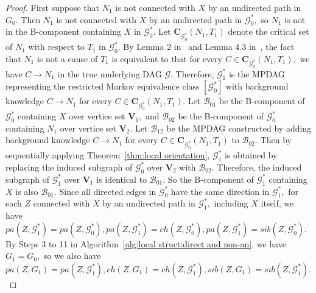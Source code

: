 \documentclass{article}
\begin{document}
\begin{proof}
First suppose that $N_1$ is not connected with $X$ by an undirected path in $G_0.$ Then $N_1$ is not connected with $X$ by an undirected path in $\mathcal{G}^*_0,$ so $N_1$ is not in the B-component containing $X$ in $\mathcal{G}^*_0.$ Let $\mathbf{C}_{\mathcal{G}^*_0}(N_1,T_1)$ denote the critical set of $N_1$ with respect to $T_1$ in $\mathcal{G}^*_0.$ By Lemma 2 in~\citet{fang2020ida} and Lemma 4.3 in~\citet{zuo2022counterfactual}, the fact that $N_1$ is not a cause of $T_1$ is equivalent to that for every $C\in \mathbf{C}_{\mathcal{G}^*_0}(N_1,T_1),$ we have $C\to N_1$ in the true underlying DAG $\mathcal{G}.$ Therefore, $\mathcal{G}^*_1$ is the MPDAG representing the restricted Markov equivalence class $[\mathcal{G}^*_0]$ with background knowledge $C\to N_1$ for every $C\in \mathbf{C}_{\mathcal{G}^*_0}(N_1,T_1).$ Let $\mathcal{B}_{01}$ be the B-component of $\mathcal{G}^*_0$ containing $X$ over vertice set $\mathbf{V}_1,$ and $\mathcal{B}_{02}$ be the B-component of $\mathcal{G}^*_0$ containing $N_1$ over vertice set $\mathbf{V}_2.$ Let $\mathcal{B}_{12}$ be the MPDAG constructed by adding background knowledge $C\to N_1$ for every $C\in \mathbf{C}_{\mathcal{G}^*_0}(N_1,T_1)$ to $\mathcal{B}_{02}.$ Then by sequentially applying Theorem~\ref{thm:local orientation}, $\mathcal{G}^*_1$ is obtained by replacing the induced subgraph of $\mathcal{G}^*_0$ over $\mathbf{V}_2$ with $\mathcal{B}_{02}.$ Therefore, the induced subgraph of $\mathcal{G}^*_1$ over $\mathbf{V}_1$ is identical to $\mathcal{B}_{01}.$ So the B-component of $\mathcal{G}^*_1$ containing $X$ is also $\mathcal{B}_{01}.$ Since all directed edges in $\mathcal{G}^*_0$ have the same direction in $\mathcal{G}^*_1,$ for each $Z$ connected with $X$ by an undirected path in $\mathcal{G}^*_1,$ including $X$ itself, we have $pa(Z,\mathcal{G}^*_1)=pa(Z,\mathcal{G}^*_0), pa(Z,\mathcal{G}^*_1)=ch(Z,\mathcal{G}^*_0), pa(Z,\mathcal{G}^*_1)=sib(Z,\mathcal{G}^*_0).$ By Steps 3 to 11 in Algorithm~\ref{alg:local struct:direct and non-an}, we have $G_1=G_0,$ so we also have $pa(Z,G_1)=pa(Z,\mathcal{G}^*_1), ch(Z,G_1)=ch(Z,\mathcal{G}^*_1), sib(Z,G_1)=sib(Z,\mathcal{G}^*_1).$


\end{proof}
\end{document}
